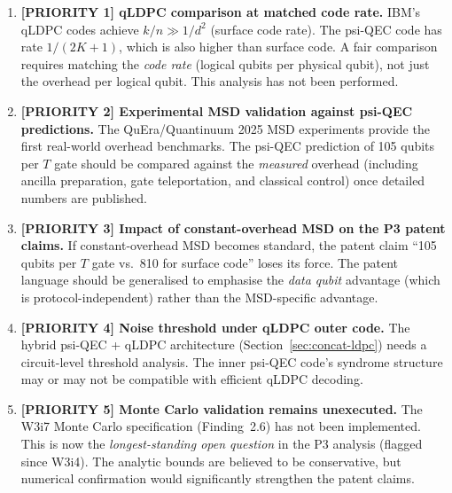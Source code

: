 \documentclass[11pt]{article}
\theoremstyle{definition}
\theoremstyle{remark}
\begin{document}
\begin{enumerate}

\item \textbf{[PRIORITY 1] qLDPC comparison at matched code rate.}
  IBM's qLDPC codes achieve $k/n \gg 1/d^2$ (surface code rate).
  The psi-QEC code has rate $1/(2K+1)$, which is also higher than
  surface code.  A fair comparison requires matching the \emph{code rate}
  (logical qubits per physical qubit), not just the overhead per logical
  qubit.  This analysis has not been performed.

\item \textbf{[PRIORITY 2] Experimental MSD validation against psi-QEC
  predictions.}
  The QuEra/Quantinuum 2025 MSD experiments provide the first real-world
  overhead benchmarks.  The psi-QEC prediction of 105 qubits per $T$ gate
  should be compared against the \emph{measured} overhead (including
  ancilla preparation, gate teleportation, and classical control) once
  detailed numbers are published.

\item \textbf{[PRIORITY 3] Impact of constant-overhead MSD on the
  P3 patent claims.}
  If constant-overhead MSD becomes standard, the patent claim ``105 qubits
  per $T$ gate vs.\ 810 for surface code'' loses its force.  The patent
  language should be generalised to emphasise the \emph{data qubit}
  advantage (which is protocol-independent) rather than the MSD-specific
  advantage.

\item \textbf{[PRIORITY 4] Noise threshold under qLDPC outer code.}
  The hybrid psi-QEC + qLDPC architecture (Section~\ref{sec:concat-ldpc})
  needs a circuit-level threshold analysis.  The inner psi-QEC code's
  syndrome structure may or may not be compatible with efficient qLDPC
  decoding.

\item \textbf{[PRIORITY 5] Monte Carlo validation remains unexecuted.}
  The W3i7 Monte Carlo specification (Finding~2.6) has not been
  implemented.  This is now the \emph{longest-standing open question}
  in the P3 analysis (flagged since W3i4).  The analytic bounds are
  believed to be conservative, but numerical confirmation would
  significantly strengthen the patent claims.

\end{enumerate}
\end{document}
